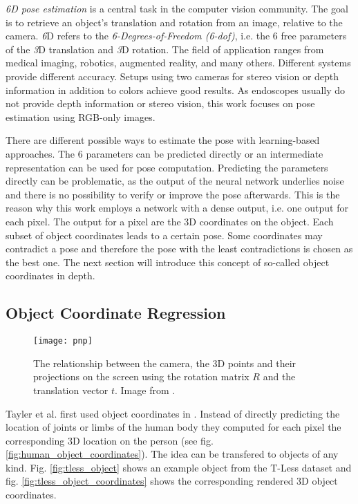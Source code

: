 \textit{6D pose estimation} is a central task in the computer vision community. The goal is to retrieve an object's translation and rotation from an image, relative to the camera. \textit{6}D refers to the \textit{6-Degrees-of-Freedom (6-\gls{dof})}, i.e. the 6 free parameters of the \textit{3}D translation and \textit{3}D rotation. The field of application ranges from medical imaging, robotics, augmented reality, and many others. Different systems provide different accuracy. Setups using two cameras for stereo vision or depth information in addition to colors achieve good results. As endoscopes usually do not provide depth information or stereo vision, this work focuses on pose estimation using RGB-only images.

There are different possible ways to estimate the pose with learning-based approaches. The 6 parameters can be predicted directly or an intermediate representation can be used for pose computation. Predicting the parameters directly can be problematic, as the output of the neural network underlies noise and there is no possibility to verify or improve the pose afterwards. This is the reason why this work employs a network with a dense output, i.e. one output  for each pixel. The output for a pixel are the 3D coordinates on the object. Each subset of object coordinates leads to a certain pose. Some coordinates may contradict a pose and therefore the pose with the least contradictions is chosen as the best one. The next section will introduce this concept of so-called object coordinates in depth.

\subsection{Object Coordinate Regression} \label{objectcoordinates}

\begin{figure}[!tbp]
	\centering
    \texttt{[image: pnp]}
    \caption{The relationship between the camera, the 3D points and their projections on the screen using the rotation matrix $R$ and the translation vector $t$. Image from \cite{opencv_pnp}.}
    	\label{fig:pnp}
\end{figure} 

Tayler et al. first used object coordinates in \cite{tsharp}. Instead of directly predicting the location of joints or limbs of the human body they computed for each pixel the corresponding 3D location on the person (see fig. \ref{fig:human_object_coordinates}). The idea can be transfered to objects of any kind. Fig. \ref{fig:tless_object} shows an example object from the T-Less dataset \cite{tless} and fig. \ref{fig:tless_object_coordinates} shows the corresponding rendered 3D object coordinates.


